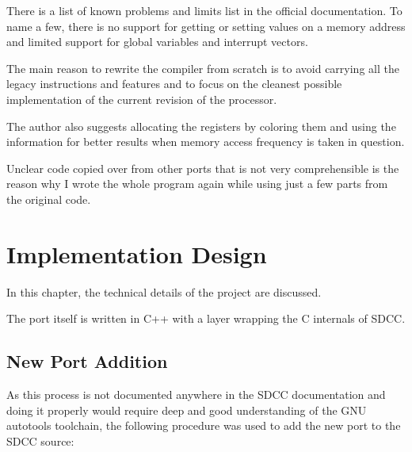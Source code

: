         There is a list of known problems and limits list in the official documentation. To name a few, there is no support for getting or setting values on a memory address and limited support for global variables and interrupt vectors.

        The main reason to rewrite the compiler from scratch is to avoid carrying all the legacy instructions and features and to focus on the cleanest possible implementation of the current revision of the processor.

        The author also suggests allocating the registers by coloring them and using the information for better results when memory access frequency is taken in question.

        Unclear code copied over from other ports that is not very comprehensible is the reason why I wrote the whole program again while using just a few parts from the original code.

\chapter{Implementation Design}\label{design}

In this chapter, the technical details of the project are discussed.

The port itself is written in C++ with a layer wrapping the C internals of SDCC.

    \section{New Port Addition}\label{compilation}

        As this process is not documented anywhere in the SDCC documentation and doing it properly would require deep and good understanding of the GNU autotools toolchain, the following procedure was used to add the new port to the SDCC source:

